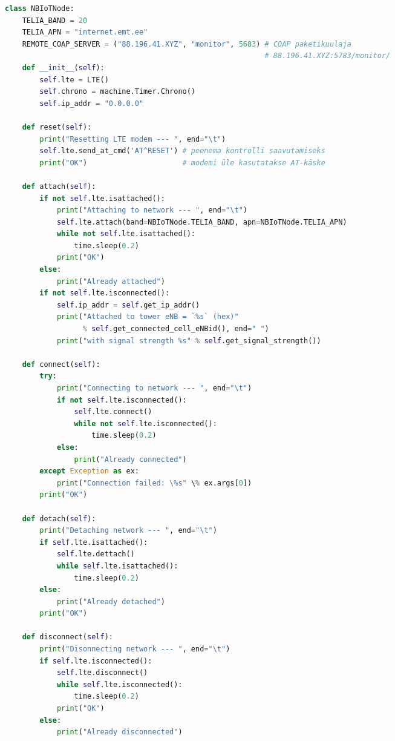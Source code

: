 \documentclass[12pt]{article}
\begin{document}
    \begin{spacing}{0.8}
        \begin{lstlisting}[language=Python]
class NBIoTNode:
    TELIA_BAND = 20
    TELIA_APN = "internet.emt.ee"
    REMOTE_COAP_SERVER = ("88.196.41.XYZ", "monitor", 5683) # COAP paketikuulaja
                                                            # 88.196.41.XYZ:5783/monitor/
    def __init__(self):
        self.lte = LTE()
        self.chrono = machine.Timer.Chrono()
        self.ip_addr = "0.0.0.0"

    def reset(self):
        print("Resetting LTE modem --- ", end="\t")
        self.lte.send_at_cmd('AT^RESET') # peenema kontrolli saavutamiseks
        print("OK")                      # modemi üle kasutatakse AT-käske

    def attach(self):
        if not self.lte.isattached():
            print("Attaching to network --- ", end="\t")
            self.lte.attach(band=NBIoTNode.TELIA_BAND, apn=NBIoTNode.TELIA_APN)
            while not self.lte.isattached():
                time.sleep(0.2)
            print("OK")
        else:
            print("Already attached")
        if not self.lte.isconnected():
            self.ip_addr = self.get_ip_addr()
            print("Attached to tower eNB = `%s` (hex)"
                  % self.get_connected_cell_eNBid(), end=" ")
            print("with signal strength %s" % self.get_signal_strength())

    def connect(self):
        try:
            print("Connecting to network --- ", end="\t")
            if not self.lte.isconnected():
                self.lte.connect()
                while not self.lte.isconnected():
                    time.sleep(0.2)
            else:
                print("Already connected")
        except Exception as ex:
            print("Connection failed: \%s" \% ex.args[0])
        print("OK")

    def detach(self):
        print("Detaching network --- ", end="\t")
        if self.lte.isattached():
            self.lte.dettach()
            while self.lte.isattached():
                time.sleep(0.2)
        else:
            print("Already detached")
        print("OK")

    def disconnect(self):
        print("Disonnecting network --- ", end="\t")
        if self.lte.isconnected():
            self.lte.disconnect()
            while self.lte.isconnected():
                time.sleep(0.2)
            print("OK")
        else:
            print("Already disconnected")


\end{lstlisting}
\end{spacing}
\end{document}
